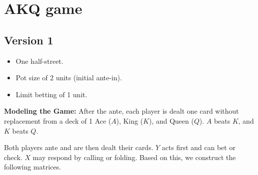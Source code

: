 \documentclass[12pt]{article}
\begin{document}
\section{AKQ game}

\subsection*{Version 1}
\begin{itemize}
    \item One half-street.
    \item Pot size of 2 units (initial ante-in).
    \item Limit betting of 1 unit.
\end{itemize}

\noindent\textbf{Modeling the Game:}  
After the ante, each player is dealt one card without replacement from a deck of 1 Ace ($A$), King ($K$), and Queen ($Q$). $A$ beats $K$, and $K$ beats $Q$.

Both players ante and are then dealt their cards. $Y$ acts first and can bet or check. $X$ may respond by calling or folding. Based on this, we construct the following matrices.
\end{document}
